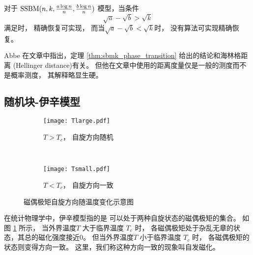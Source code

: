 \begin{theorem}\label{thm:sbmk_phase_transition}
  对于 $\operatorname{SSBM}(n,k,\frac{a \log n}{n}, \frac{b \log n}{n})$ 模型，当条件
  \begin{equation}\label{eq:abk}
    \sqrt{a} - \sqrt{b} > \sqrt{k}
  \end{equation}   
  满足时，
  精确恢复可实现，
  而当$\sqrt{a} - \sqrt{b} < \sqrt{k}$时，
  没有算法可实现精确恢复。
\end{theorem}
\begin{remark}
  Abbe 在文章中指出，定理 \ref{thm:sbmk_phase_transition} 
  给出的结论和海林格距离 (Hellinger distance)有关。
  但他在文章中使用的距离度量仅是一般的测度而不是概率测度，
  其解释略显生硬。
\end{remark}

\subsection{随机块-伊辛模型}\label{sec:ising}
\begin{figure}
	\centering
	\begin{subfigure}{0.5\textwidth}
    \centering
    \texttt{[image: Tlarge.pdf]}
		\caption{$T>T_c$， 自旋方向随机}
	\end{subfigure}~
	\begin{subfigure}{0.5\textwidth}
    \centering
    \texttt{[image: Tsmall.pdf]}
		\caption{$T<T_c$， 自旋方向一致}
	\end{subfigure}
  \caption{磁偶极矩自旋方向随温度变化示意图}\label{fig:ising_two_configurations}
\end{figure}   

在统计物理学中，伊辛模型指的是
可以处于两种自旋状态的磁偶极矩的集合\cite{ising1925beitrag}。
如图 \ref{fig:ising_two_configurations} 所示，
当外界温度$T$
大于临界温度 $T_c$ 时，
各磁偶极矩处于杂乱无章的状态，其总的磁化强度接近0。
但当外界温度$T$
小于临界温度 $T_c$ 时，
各磁偶极矩的状态则变得方向一致。
这里，我们称这种方向一致的现象叫自发磁化。


